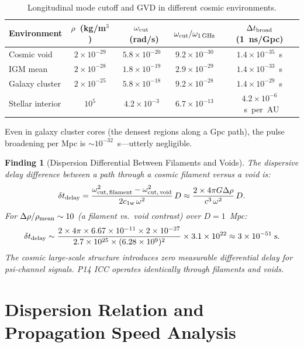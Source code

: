 \documentclass[11pt]{article}
\newtheorem{finding}{Finding}
\newcommand{\ee}[1]{\times 10^{#1}}
\newcommand{\cfield}{c_{1\mathrm{w}}}
\begin{document}
\begin{table}[h]
\centering
\caption{Longitudinal mode cutoff and GVD in different cosmic environments.}
\begin{tabular}{lcccc}
\toprule
Environment & $\rho$~(kg/m$^3$) & $\omega_{\rm cut}$~(rad/s) & $\omega_{\rm cut}/\omega_{\rm 1\,GHz}$ & $\Delta t_{\rm broad}$ (1~ns/Gpc) \\
\midrule
Cosmic void & $2\ee{-29}$ & $5.8\ee{-20}$ & $9.2\ee{-30}$ & $1.4\ee{-35}$~s \\
IGM mean & $2\ee{-28}$ & $1.8\ee{-19}$ & $2.9\ee{-29}$ & $1.4\ee{-33}$~s \\
Galaxy cluster & $2\ee{-25}$ & $5.8\ee{-18}$ & $9.2\ee{-28}$ & $1.4\ee{-29}$~s \\
Stellar interior & $10^5$ & $4.2\ee{-3}$ & $6.7\ee{-13}$ & $4.2\ee{-6}$~s~per~AU \\
\bottomrule
\end{tabular}
\end{table}

Even in galaxy cluster cores (the densest regions along a Gpc path),
the pulse broadening per Mpc is $\sim 10^{-32}$~s---utterly negligible.

\begin{finding}[Dispersion Differential Between Filaments and Voids]
The dispersive delay difference between a path through a cosmic
filament versus a void is:
\begin{equation}
\delta t_{\rm delay} = \frac{\omega_{\rm cut,\,filament}^2 - \omega_{\rm cut,\,void}^2}{2\cfield\,\omega^2}\,D
\approx \frac{2 \times 4\pi G \Delta\rho}{c^3\,\omega^2}\,D.
\end{equation}
For $\Delta\rho/\rho_{\rm mean} \sim 10$ (a filament vs.\ void contrast)
over $D = 1$~Mpc:
\begin{equation}
\delta t_{\rm delay} \sim \frac{2 \times 4\pi \times 6.67\ee{-11} \times 2\ee{-27}}
{2.7\ee{25} \times (6.28\ee{9})^2} \times 3.1\ee{22}
\approx 3\ee{-51}\;\text{s}.
\end{equation}
The cosmic large-scale structure introduces zero measurable differential
delay for psi-channel signals. P14 ICC operates identically through
filaments and voids.
\end{finding}

\section{Dispersion Relation and Propagation Speed Analysis}
\label{sec:dispersion-speed}
\end{document}
